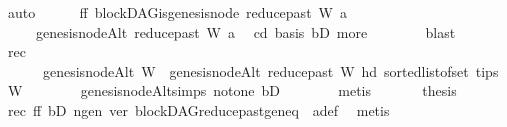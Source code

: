 \begin{isabellebody}
\ auto\isanewline
\ \ \ \ \isamarkupfalse%
\ ff{\isacharcolon}{\kern0pt}\ {\isachardoublequoteopen}blockDAG{\isachardot}{\kern0pt}is{\isacharunderscore}{\kern0pt}genesis{\isacharunderscore}{\kern0pt}node\ {\isacharparenleft}{\kern0pt}reduce{\isacharunderscore}{\kern0pt}past\ W\ a{\isacharparenright}{\kern0pt}\isanewline
\ \ \ \ \ {\isacharparenleft}{\kern0pt}genesis{\isacharunderscore}{\kern0pt}nodeAlt\ {\isacharparenleft}{\kern0pt}reduce{\isacharunderscore}{\kern0pt}past\ W\ a{\isacharparenright}{\kern0pt}{\isacharparenright}{\kern0pt}{\isachardoublequoteclose}\ \isamarkupfalse%
\ cd{}\ basis\ bD{}\ more\isanewline
\ \ \ \ \ \ \isamarkupfalse%
\ blast\isanewline
\ \ \ \ \isamarkupfalse%
\ rec{\isacharcolon}{\kern0pt}\ \isanewline
\ \ \ \ \ \ {\isachardoublequoteopen}genesis{\isacharunderscore}{\kern0pt}nodeAlt\ W\ {\isacharequal}{\kern0pt}\ genesis{\isacharunderscore}{\kern0pt}nodeAlt\ {\isacharparenleft}{\kern0pt}reduce{\isacharunderscore}{\kern0pt}past\ W\ {\isacharparenleft}{\kern0pt}hd\ {\isacharparenleft}{\kern0pt}sorted{\isacharunderscore}{\kern0pt}list{\isacharunderscore}{\kern0pt}of{\isacharunderscore}{\kern0pt}set\ {\isacharparenleft}{\kern0pt}tips\ W{\isacharparenright}{\kern0pt}{\isacharparenright}{\kern0pt}{\isacharparenright}{\kern0pt}{\isacharparenright}{\kern0pt}{\isachardoublequoteclose}\isanewline
\ \ \ \ \ \ \isamarkupfalse%
\ genesis{\isacharunderscore}{\kern0pt}nodeAlt{\isachardot}{\kern0pt}simps\ not{\isacharunderscore}{\kern0pt}one\ bD\isanewline
\ \ \ \ \ \ \isamarkupfalse%
\ metis\ \isanewline
\ \ \ \ \isamarkupfalse%
\ {\isacharquery}{\kern0pt}thesis\ \isamarkupfalse%
\ rec\ ff\ bD\ n{\isacharunderscore}{\kern0pt}gen\ ver\ blockDAG{\isachardot}{\kern0pt}reduce{\isacharunderscore}{\kern0pt}past{\isacharunderscore}{\kern0pt}gen{\isacharunderscore}{\kern0pt}eq\ \ a{\isacharunderscore}{\kern0pt}def\ \isamarkupfalse%
\ metis\isanewline
\ \ \isamarkupfalse%
\isanewline
{}\isamarkupfalse%
%
\endisatagproof
{\isafoldproof}%
%
\isadelimproof
\ \ \ \ \ \ \ \ \ \ \ \ \ \ \ \ \ \ \ \ \ \ \ \ \ \ \ \ \ \ \ \ \ \ \isanewline
%
\endisadelimproof
\isanewline
%
\isadelimtheory
\isanewline
%
\endisadelimtheory
%
\isatagtheory
{}\isamarkupfalse%
%
\endisatagtheory
{\isafoldtheory}%
%
\isadelimtheory
%
\endisadelimtheory
%
\end{isabellebody}%
\endinput
